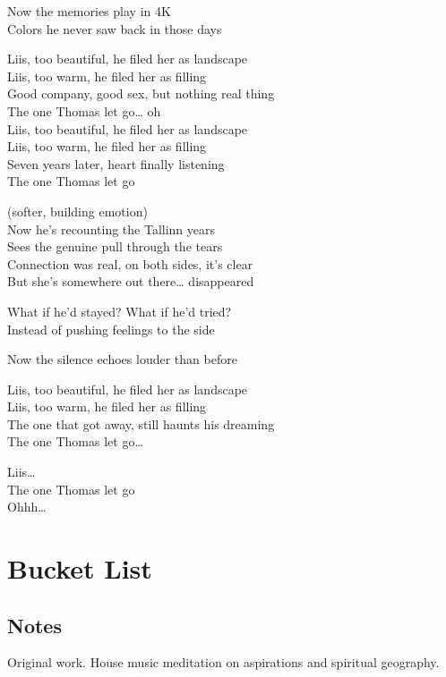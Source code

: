 \begin{lyrics}
Now the memories play in 4K\\
Colors he never saw back in those days

Liis, too beautiful, he filed her as landscape\\
Liis, too warm, he filed her as filling\\
Good company, good sex, but nothing real thing\\
The one Thomas let go… oh\\
Liis, too beautiful, he filed her as landscape\\
Liis, too warm, he filed her as filling\\
Seven years later, heart finally listening\\
The one Thomas let go

(softer, building emotion)\\
Now he’s recounting the Tallinn years\\
Sees the genuine pull through the tears\\
Connection was real, on both sides, it’s clear\\
But she’s somewhere out there… disappeared

What if he’d stayed? What if he’d tried?\\
Instead of pushing feelings to the side

Now the silence echoes louder than before

Liis, too beautiful, he filed her as landscape\\
Liis, too warm, he filed her as filling\\
The one that got away, still haunts his dreaming\\
The one Thomas let go…

Liis…\\
The one Thomas let go\\
Ohhh…
\end{lyrics}

\section{Bucket List}

\subsection{Notes}
Original work.
House music meditation on aspirations and spiritual geography.

